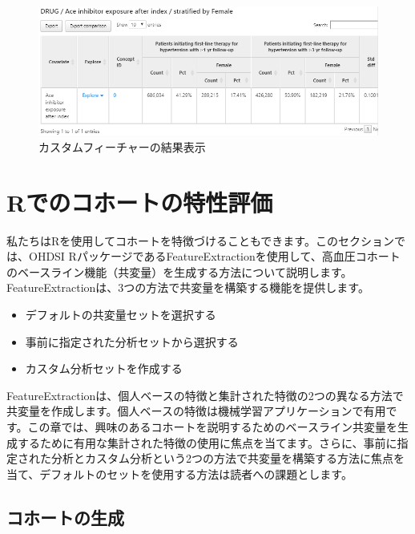 \documentclass[
  11pt]{book}
\providecommand{\tightlist}{%
  \setlength{\itemsep}{0pt}\setlength{\parskip}{0pt}}
\theoremstyle{definition}
\theoremstyle{definition}
\theoremstyle{definition}
\theoremstyle{definition}
\theoremstyle{remark}
\begin{document}
\begin{figure}

{\centering \includegraphics[width=1\linewidth]{images/Characterization/atlasCharacterizationCustomFeatureResults} 

}

\caption{カスタムフィーチャーの結果表示}\label{fig:atlasCharacterizationCustomFeatureResults}
\end{figure}

\section{Rでのコホートの特性評価}\label{rux3067ux306eux30b3ux30dbux30fcux30c8ux306eux7279ux6027ux8a55ux4fa1}

私たちはRを使用してコホートを特徴づけることもできます。このセクションでは、OHDSI RパッケージであるFeatureExtractionを使用して、高血圧コホートのベースライン機能（共変量）を生成する方法について説明します。FeatureExtractionは、3つの方法で共変量を構築する機能を提供します。 

\begin{itemize}
\tightlist
\item
  デフォルトの共変量セットを選択する
\item
  事前に指定された分析セットから選択する
\item
  カスタム分析セットを作成する
\end{itemize}

FeatureExtractionは、個人ベースの特徴と集計された特徴の2つの異なる方法で共変量を作成します。個人ベースの特徴は機械学習アプリケーションで有用です。この章では、興味のあるコホートを説明するためのベースライン共変量を生成するために有用な集計された特徴の使用に焦点を当てます。さらに、事前に指定された分析とカスタム分析という2つの方法で共変量を構築する方法に焦点を当て、デフォルトのセットを使用する方法は読者への課題とします。

\subsection{コホートの生成}\label{ux30b3ux30dbux30fcux30c8ux306eux751fux6210}
\end{document}

